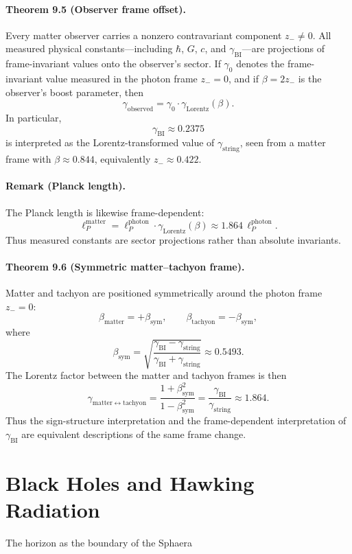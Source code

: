 \paragraph*{Theorem 9.5 (Observer frame offset).}
Every matter observer carries a nonzero contravariant component $z_- \neq 0$. All measured physical constants---including $\hbar$, $G$, $c$, and $\gamma_{\mathrm{BI}}$---are projections of frame-invariant values onto the observer's sector. If $\gamma_0$ denotes the frame-invariant value measured in the photon frame $z_-=0$, and if $\beta=2z_-$ is the observer's boost parameter, then
\[
\gamma_{\mathrm{observed}} = \gamma_0 \cdot \gamma_{\mathrm{Lorentz}}(\beta).
\]
In particular,
\[
\gamma_{\mathrm{BI}} \approx 0.2375
\]
is interpreted as the Lorentz-transformed value of $\gamma_{\mathrm{string}}$, seen from a matter frame with $\beta \approx 0.844$, equivalently $z_- \approx 0.422$.

\paragraph*{Remark (Planck length).}
The Planck length is likewise frame-dependent:
\[
\ell_P^{\mathrm{matter}} = \ell_P^{\mathrm{photon}} \cdot \gamma_{\mathrm{Lorentz}}(\beta) \approx 1.864\, \ell_P^{\mathrm{photon}}.
\]
Thus measured constants are sector projections rather than absolute invariants.

\paragraph*{Theorem 9.6 (Symmetric matter--tachyon frame).}
Matter and tachyon are positioned symmetrically around the photon frame $z_-=0$:
\[
\beta_{\mathrm{matter}} = +\beta_{\mathrm{sym}}, \qquad \beta_{\mathrm{tachyon}} = -\beta_{\mathrm{sym}},
\]
where
\[
\beta_{\mathrm{sym}} = \sqrt{\frac{\gamma_{\mathrm{BI}}-\gamma_{\mathrm{string}}}{\gamma_{\mathrm{BI}}+\gamma_{\mathrm{string}}}} \approx 0.5493.
\]
The Lorentz factor between the matter and tachyon frames is then
\[
\gamma_{\mathrm{matter}\leftrightarrow\mathrm{tachyon}} = \frac{1+\beta_{\mathrm{sym}}^2}{1-\beta_{\mathrm{sym}}^2} = \frac{\gamma_{\mathrm{BI}}}{\gamma_{\mathrm{string}}} \approx 1.864.
\]
Thus the sign-structure interpretation and the frame-dependent interpretation of $\gamma_{\mathrm{BI}}$ are equivalent descriptions of the same frame change.


\section{Black Holes and Hawking Radiation}
The horizon as the boundary of the Sphaera
